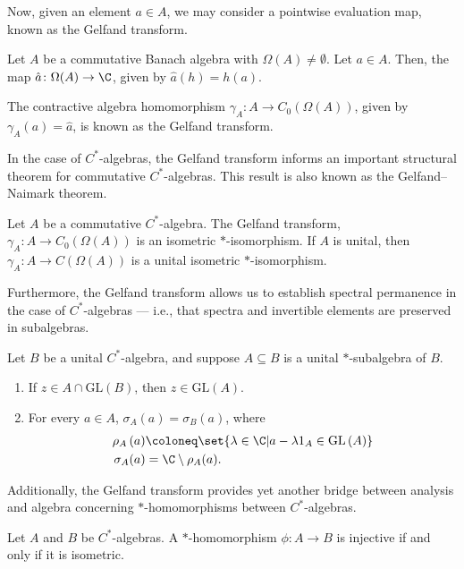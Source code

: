 Now, given an element $a\in A$, we may consider a pointwise evaluation map, known as the Gelfand transform.
\begin{definition}\label{def:gelfand_transform}
  Let $A$ be a commutative Banach algebra with $\Omega(A)\neq \emptyset$. Let $a\in A$. Then, the map $\hat{a}\colon \Omega(A)\rightarrow \C$, given by $\hat{a}(h) = h(a)$. \newline

  The contractive algebra homomorphism $\gamma_A\colon A\rightarrow C_0\left( \Omega\left( A \right) \right)$, given by $\gamma_A(a) = \hat{a}$, is known as the Gelfand transform.
\end{definition}
In the case of $C^{\ast}$-algebras, the Gelfand transform informs an important structural theorem for commutative $C^{\ast}$-algebras. This result is also known as the Gelfand--Naimark theorem.
\begin{theorem}\label{thm:gelfand_naimark}
  Let $A$ be a commutative $C^{\ast}$-algebra. The Gelfand transform, $\gamma_A\colon A\rightarrow C_0\left( \Omega\left( A \right) \right)$ is an isometric $\ast$-isomorphism. If $A$ is unital, then $\gamma_A\colon A\rightarrow C\left( \Omega\left( A \right) \right)$ is a unital isometric $\ast$-isomorphism.
\end{theorem}
Furthermore, the Gelfand transform allows us to establish spectral permanence in the case of $C^{\ast}$-algebras --- i.e., that spectra and invertible elements are preserved in subalgebras.
\begin{proposition}
  Let $B$ be a unital $C^{\ast}$-algebra, and suppose $A\subseteq B$ is a unital $\ast$-subalgebra of $B$.
  \begin{enumerate}[(1)]
    \item If $z\in A\cap \text{GL}\left( B \right)$, then $z\in \text{GL}\left( A \right)$.
    \item For every $a\in A$, $\sigma_{A}(a) = \sigma_B(a)$, where 
      \begin{align*}
        \rho_A\left( a \right) &\coloneq \set{\lambda\in \C | a - \lambda 1_A \in \text{GL}\left( A \right)}\\
        \sigma_A(a) &= \C\setminus \rho_A(a).
      \end{align*}
  \end{enumerate}
\end{proposition}
Additionally, the Gelfand transform provides yet another bridge between analysis and algebra concerning $\ast$-homomorphisms between $C^{\ast}$-algebras.
\begin{proposition}
  Let $A$ and $B$ be $C^{\ast}$-algebras. A $\ast$-homomorphism $\phi\colon A\rightarrow B$ is injective if and only if it is isometric.
\end{proposition}
